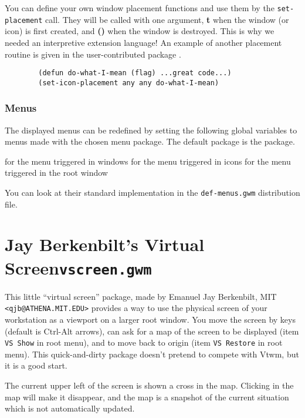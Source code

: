 You can define your own window placement functions and use them by the
\verb"set-placement" call. They will be called with one argument, {\bf t}
when the window (or icon) is first created, and {\bf ()} when the window is
destroyed. This is why we needed an interpretive extension language! An example
of another placement routine is given in the user-contributed package
.

{\exemplefont\begin{verbatim}
        (defun do-what-I-mean (flag) ...great code...)
        (set-icon-placement any any do-what-I-mean)
\end{verbatim}}

\subsubsection{Menus}

The displayed menus can be redefined by setting the following global
variables to menus made with the chosen menu package. The default package
is the  package.

\begin{description}
 for the menu triggered in windows
 for the menu triggered in icons
 for the menu triggered in the root window
\end{description}

You can look at their standard implementation in the \verb"def-menus.gwm"
distribution file.

\section{Jay Berkenbilt's Virtual Screen\hfill{\tt vscreen.gwm}}
\label{vscreen}

This little ``virtual screen'' package, made by Emanuel Jay Berkenbilt, MIT
\verb|<qjb@ATHENA.MIT.EDU>| provides a way to use the physical screen of your
workstation as a viewport on a larger root window. You move the screen by keys
(default is {\sc Ctrl-Alt} arrows), can ask for a map of the screen to be
displayed (item \verb|VS Show| in root menu), and to move back to origin (item
\verb|VS Restore| in root menu). This quick-and-dirty package doesn't pretend
to compete with {\sc Vtwm}, but it is a good start.

The current upper left of the screen is shown a cross in the map. Clicking in
the map will make it disappear, and the map is a snapshot of the current
situation which is not automatically updated.

